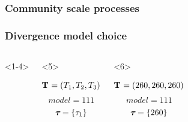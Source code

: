 \begin{frame}
    \frametitle<1-4>{Community scale processes}
    \frametitle<5->{Divergence model choice}
    \begin{columns}[c]
        \begin{onlyenv}<1-4>
            \begin{minipage}[c][0.5\textheight][c]{\linewidth}
            \end{minipage}
        \end{onlyenv}
        \begin{onlyenv}<5>
            \begin{minipage}[c][0.5\textheight][c]{\linewidth}
                \begin{displaybox}[0.95\linewidth]
                    \begin{minipage}[c][0.45\textheight][c]{0.95\linewidth}
                        \[
                            \mathbf{T_{}} = (T_{1},T_{2},T_{3})
                        \]\vspace{0mm}
                        \[
                            model = 111
                        \]\vspace{0mm}
                        \[
                            \boldsymbol{\tau_{}} = \{\tau_{1}\}
                        \]\vspace{0mm}
                    \end{minipage}
                \end{displaybox}
            \end{minipage}
        \end{onlyenv}
        \begin{onlyenv}<6>
            \begin{minipage}[c][0.5\textheight][c]{\linewidth}
                \begin{displaybox}[0.95\linewidth]
                    \begin{minipage}[c][0.45\textheight][c]{0.95\linewidth}
                        \[
                            \mathbf{T_{}} = (260,260,260)
                        \]\vspace{0mm}
                        \[
                            model = 111
                        \]\vspace{0mm}
                        \[
                            \boldsymbol{\tau_{}} = \{260\}
                        \]\vspace{0mm}

\end{minipage}
\end{displaybox}
\end{minipage}
\end{onlyenv}
\end{columns}
\end{frame}
